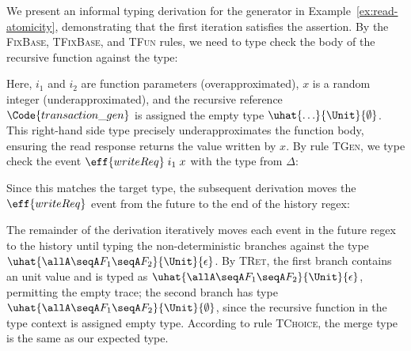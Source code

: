 \begin{example}
  We present an informal typing derivation for the generator in
  Example~\ref{ex:read-atomicity}, demonstrating that the first
  iteration satisfies the assertion. By the \textsc{FixBase},
  \textsc{TFixBase}, and \textsc{TFun} rules, we need to type check
  the body of the recursive function against the type: %
  \vspace{-.4cm} \par{}%
  \noindent Here, $i_1$ and $i_2$ are function parameters
  (overapproximated), $x$ is a random integer (underapproximated), and
  the recursive reference $\Code{transaction\_gen}$ is assigned the
  empty type $\uhat{\ldots}{\Unit}{\emptyset}$. This right-hand side
  type precisely underapproximates the function body, ensuring the
  read response returns the value written by $x$.  By rule
  \textsc{TGen}, we type check the event $\eff{writeReq}\;i_1\;x$ with
  the type from $\Delta$: %
  \vspace{-.4cm} \par{}
  Since this matches the target type, the subsequent derivation moves
  the $\eff{writeReq}$ event from the future to the end of the history
  regex: %
  \vspace{-.4cm} \par{}%
  \noindent The remainder of the derivation iteratively moves each
  event in the future regex to the history until typing the
  non-deterministic branches against the type
  $\uhat{\allA \seqA F_1 \seqA F_2}{\Unit}{\epsilon}$. By
  \textsc{TRet}, the first branch contains an unit value and is typed
  as $\uhat{\allA \seqA F_1 \seqA F_2}{\Unit}{\epsilon}$, permitting
  the empty trace; the second branch has type
  $\uhat{\allA \seqA F_1 \seqA F_2}{\Unit}{\emptyset}$, since the
  recursive function in the type context is assigned empty
  type. According to rule \textsc{TChoice}, the merge type is the same
  as our expected type.
\end{example}

